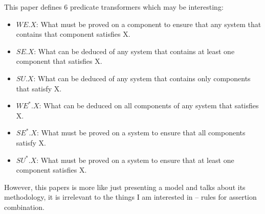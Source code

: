 \documentclass[12pt, fleqn]{article}
\begin{document}
This paper defines 6 predicate transformers which may be interesting:

\begin{itemize}
\item $WE.X$: What must be proved on a component to ensure that any
  system that contains that component satisfies X.
\item $SE.X$: What can be deduced of any system that contains at least
  one component that satisfies X.
\item $SU.X$: What can be deduced of any system that contains only
  components that satisfy X.
\item $WE^*.X$: What can be deduced on all components of any system
  that satisfies X.
\item $SE^*.X$: What must be proved on a system to ensure that all
  components satisfy X.
\item $SU^*.X$: What must be proved on a system to ensure that at
  least one component satisfies X.
\end{itemize}

However, this papers is more like just presenting a model and talks
about its methodology, it is irrelevant to the things I am interested
in -- rules for assertion combination.


\end{document}
